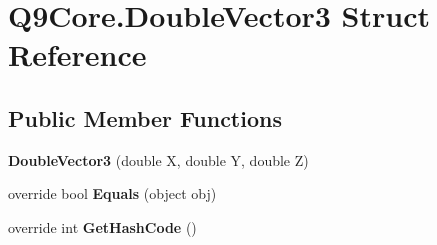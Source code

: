 \hypertarget{struct_q9_core_1_1_double_vector3}{}\section{Q9\+Core.\+Double\+Vector3 Struct Reference}
\label{struct_q9_core_1_1_double_vector3}
\subsection*{Public Member Functions}
\begin{DoxyCompactItemize}
\item 
\mbox{\label{struct_q9_core_1_1_double_vector3_a0eaa5834998fc15e7be5206e844d3bdf}} 
{\bfseries Double\+Vector3} (double X, double Y, double Z)
\item 
\mbox{\label{struct_q9_core_1_1_double_vector3_a30020f967a041951e2996f3f09782e9e}} 
override bool {\bfseries Equals} (object obj)
\item 
\mbox{\label{struct_q9_core_1_1_double_vector3_a35362081e06525506cd24c33474ca8c8}} 
override int {\bfseries Get\+Hash\+Code} ()
\end{DoxyCompactItemize}
